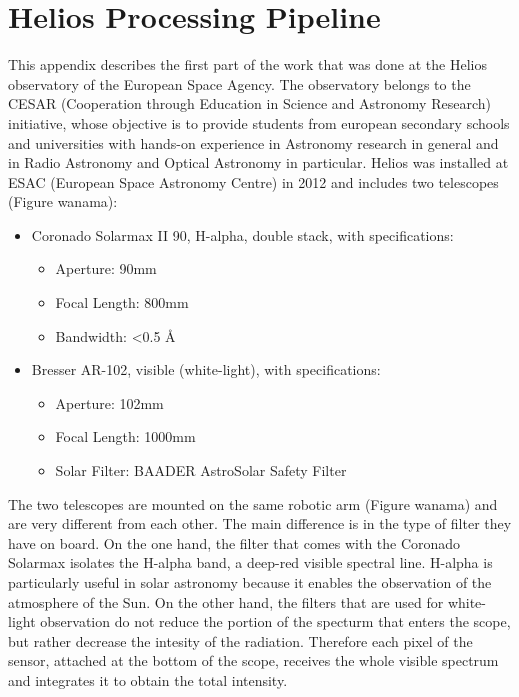 \chapter{Helios Processing Pipeline}
\label{appendiceC}
\thispagestyle{empty}
This appendix describes the first part of the work that was done at the Helios observatory of the European Space Agency. The observatory belongs to the CESAR (Cooperation through Education in Science and Astronomy Research) initiative, whose objective is to provide students from european secondary schools and universities with hands-on experience in Astronomy research in general and in Radio Astronomy and Optical Astronomy in particular. Helios was installed at ESAC (European Space Astronomy Centre) in 2012 and includes two telescopes (Figure wanama):
\begin{itemize}
  \item Coronado Solarmax II 90, H-alpha, double stack, with specifications:
  \begin{itemize}
    \item Aperture: 90mm
    \item Focal Length: 800mm
    \item Bandwidth: \textless0.5 \AA
  \end{itemize}
  \item Bresser AR-102, visible (white-light), with specifications:
  \begin{itemize}
    \item Aperture: 102mm
    \item Focal Length: 1000mm
    \item Solar Filter: BAADER AstroSolar Safety Filter
  \end{itemize}
\end{itemize}
\bigbreak
The two telescopes are mounted on the same robotic arm (Figure wanama) and are very different from each other. The main difference is in the type of filter they have on board. On the one hand, the filter that comes with the Coronado Solarmax isolates the H-alpha band, a deep-red visible spectral line. H-alpha is particularly useful in solar astronomy because it enables the observation of the atmosphere of the Sun. On the other hand, the filters that are used for white-light observation do not reduce the portion of the specturm that enters the scope, but rather decrease the intesity of the radiation. Therefore each pixel of the sensor, attached at the bottom of the scope, receives the whole visible spectrum and integrates it to obtain the total intensity.
\bigbreak

